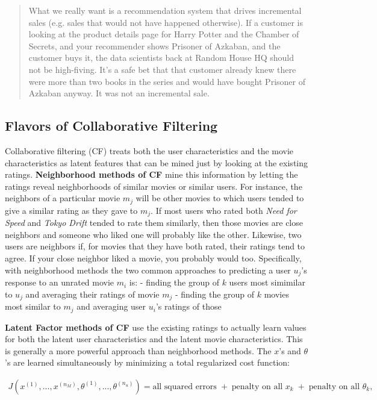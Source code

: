 \documentclass[11pt]{article}
\begin{document}
\begin{quote}
What we really want is a recommendation system that drives incremental
sales (e.g. sales that would not have happened otherwise). If a customer
is looking at the product details page for Harry Potter and the Chamber
of Secrets, and your recommender shows Prisoner of Azkaban, and the
customer buys it, the data scientists back at Random House HQ should not
be high-fiving. It's a safe bet that that customer already knew there
were more than two books in the series and would have bought Prisoner of
Azkaban anyway. It was not an incremental sale.
\end{quote}

    \subsection{Flavors of Collaborative
Filtering}\label{flavors-of-collaborative-filtering}

Collaborative filtering (CF) treats both the user characteristics and
the movie characteristics as latent features that can be mined just by
looking at the existing ratings. \textbf{Neighborhood methods of CF}
mine this information by letting the ratings reveal neighborhoods of
similar movies or similar users. For instance, the neighbors of a
particular movie \(m_j\) will be other movies to which users tended to
give a similar rating as they gave to \(m_j\). If most users who rated
both \emph{Need for Speed} and \emph{Tokyo Drift} tended to rate them
similarly, then those movies are close neighbors and someone who liked
one will probably like the other. Likewise, two users are neighbors if,
for movies that they have both rated, their ratings tend to agree. If
your close neighbor liked a movie, you probably would too. Specifically,
with neighborhood methods the two common approaches to predicting a user
\(u_j\)'s response to an unrated movie \(m_i\) is: - finding the group
of \(k\) users most simimilar to \(u_j\) and averaging their ratings of
movie \(m_j\) - finding the group of \(k\) movies most similar to
\(m_j\) and averaging user \(u_i\)'s ratings of those

\textbf{Latent Factor methods of CF} use the existing ratings to
actually learn values for both the latent user characteristics and the
latent movie characteristics. This is generally a more powerful approach
than neighborhood methods. The \(x\)'s and \(\theta\)'s are learned
simultaneously by minimizing a total regularized cost function:

\begin{align*}
J(x^{(1)},..., x^{(n_M)}, \theta^{(1)}, ..., \theta^{(n_u)}) = \textrm{all squared errors} \; + \; \textrm{penalty on all $x_k$} \; + \; \textrm{penalty on all $\theta_k$},
\end{align*}
\end{document}
